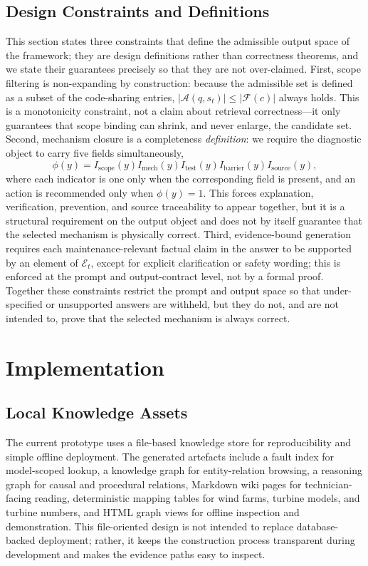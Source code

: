 \documentclass[lettersize,journal]{IEEEtran}
\begin{document}
\subsection{Design Constraints and Definitions}
\label{sec:properties}
This section states three constraints that define the admissible output space of the framework; they are design definitions rather than correctness theorems, and we state their guarantees precisely so that they are not over-claimed. First, scope filtering is non-expanding by construction: because the admissible set is defined as a subset of the code-sharing entries, $|\mathcal{A}(q,s_t)|\leq|\mathcal{F}(c)|$ always holds. This is a monotonicity constraint, not a claim about retrieval correctness---it only guarantees that scope binding can shrink, and never enlarge, the candidate set. Second, mechanism closure is a completeness \emph{definition}: we require the diagnostic object to carry five fields simultaneously,
\begin{equation}
\phi(y)=I_{\mathrm{scope}}(y)I_{\mathrm{mech}}(y)I_{\mathrm{test}}(y)I_{\mathrm{barrier}}(y)I_{\mathrm{source}}(y),
\end{equation}
where each indicator is one only when the corresponding field is present, and an action is recommended only when $\phi(y)=1$. This forces explanation, verification, prevention, and source traceability to appear together, but it is a structural requirement on the output object and does not by itself guarantee that the selected mechanism is physically correct. Third, evidence-bound generation requires each maintenance-relevant factual claim in the answer to be supported by an element of $\mathcal{E}_t$, except for explicit clarification or safety wording; this is enforced at the prompt and output-contract level, not by a formal proof. Together these constraints restrict the prompt and output space so that under-specified or unsupported answers are withheld, but they do not, and are not intended to, prove that the selected mechanism is always correct.

\section{Implementation}
\subsection{Local Knowledge Assets}
The current prototype uses a file-based knowledge store for reproducibility and simple offline deployment. The generated artefacts include a fault index for model-scoped lookup, a knowledge graph for entity-relation browsing, a reasoning graph for causal and procedural relations, Markdown wiki pages for technician-facing reading, deterministic mapping tables for wind farms, turbine models, and turbine numbers, and HTML graph views for offline inspection and demonstration. This file-oriented design is not intended to replace database-backed deployment; rather, it keeps the construction process transparent during development and makes the evidence paths easy to inspect.
\end{document}
